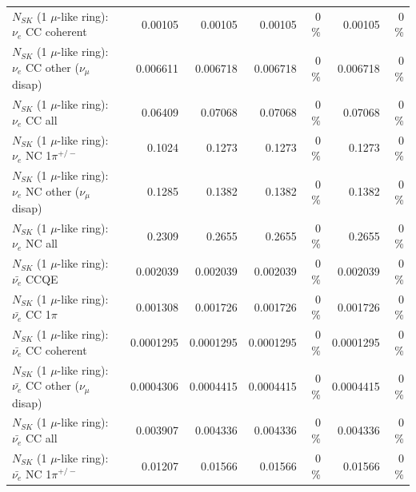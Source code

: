 \begin{table}
\begin{tabular}{| l | r | r | r  r | r  r |}
                               $N_{SK}$ (1 $\mu$-like ring): $\nu_e$ CC coherent &         0.00105 &         0.00105 &         0.00105 &        0 \%  &         0.00105 &        0 \%  \\ 
                $N_{SK}$ (1 $\mu$-like ring): $\nu_e$ CC other ($\nu_\mu$ disap) &        0.006611 &        0.006718 &        0.006718 &        0 \%  &        0.006718 &        0 \%  \\ 
                                  $N_{SK}$ (1 $\mu$-like ring): $\nu_{e}$ CC all &         0.06409 &         0.07068 &         0.07068 &        0 \%  &         0.07068 &        0 \%  \\ 
\hline
                           $N_{SK}$ (1 $\mu$-like ring): $\nu_e$ NC 1$\pi^{+/-}$ &          0.1024 &          0.1273 &          0.1273 &        0 \%  &          0.1273 &        0 \%  \\ 
                $N_{SK}$ (1 $\mu$-like ring): $\nu_e$ NC other ($\nu_\mu$ disap) &          0.1285 &          0.1382 &          0.1382 &        0 \%  &          0.1382 &        0 \%  \\ 
                                  $N_{SK}$ (1 $\mu$-like ring): $\nu_{e}$ NC all &          0.2309 &          0.2655 &          0.2655 &        0 \%  &          0.2655 &        0 \%  \\ 
\hline
\hline
\hline
                                $N_{SK}$ (1 $\mu$-like ring): $\bar{\nu_e}$ CCQE &        0.002039 &        0.002039 &        0.002039 &        0 \%  &        0.002039 &        0 \%  \\ 
                           $N_{SK}$ (1 $\mu$-like ring): $\bar{\nu_e}$ CC 1$\pi$ &        0.001308 &        0.001726 &        0.001726 &        0 \%  &        0.001726 &        0 \%  \\ 
                         $N_{SK}$ (1 $\mu$-like ring): $\bar{\nu_e}$ CC coherent &       0.0001295 &       0.0001295 &       0.0001295 &        0 \%  &       0.0001295 &        0 \%  \\ 
          $N_{SK}$ (1 $\mu$-like ring): $\bar{\nu_e}$ CC other ($\nu_\mu$ disap) &       0.0004306 &       0.0004415 &       0.0004415 &        0 \%  &       0.0004415 &        0 \%  \\ 
                            $N_{SK}$ (1 $\mu$-like ring): $\bar{\nu_{e}}$ CC all &        0.003907 &        0.004336 &        0.004336 &        0 \%  &        0.004336 &        0 \%  \\ 
\hline
                     $N_{SK}$ (1 $\mu$-like ring): $\bar{\nu_e}$ NC 1$\pi^{+/-}$ &         0.01207 &         0.01566 &         0.01566 &        0 \%  &         0.01566 &        0 \%  \\ 

\end{tabular}
\end{table}
